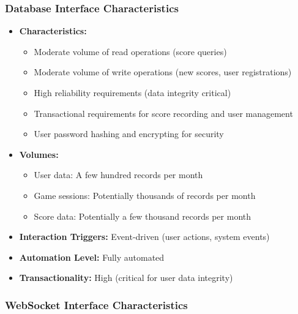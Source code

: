 \subsubsection{Database Interface Characteristics}


\begin{itemize}
    \item \textbf{Characteristics:}
          \begin{itemize}
              \item Moderate volume of read operations (score queries)
              \item Moderate volume of write operations (new scores, user registrations)
              \item High reliability requirements (data integrity critical)
              \item Transactional requirements for score recording and user management
              \item User password hashing and encrypting for security
          \end{itemize}
    \item \textbf{Volumes:}
          \begin{itemize}
              \item User data: A few hundred records per month
              \item Game sessions: Potentially thousands of records per month
              \item Score data: Potentially a few thousand records per month
          \end{itemize}
    \item \textbf{Interaction Triggers:} Event-driven (user actions, system events)
    \item \textbf{Automation Level:} Fully automated
    \item \textbf{Transactionality:} High (critical for user data integrity)
\end{itemize}

\subsubsection{WebSocket Interface Characteristics}


